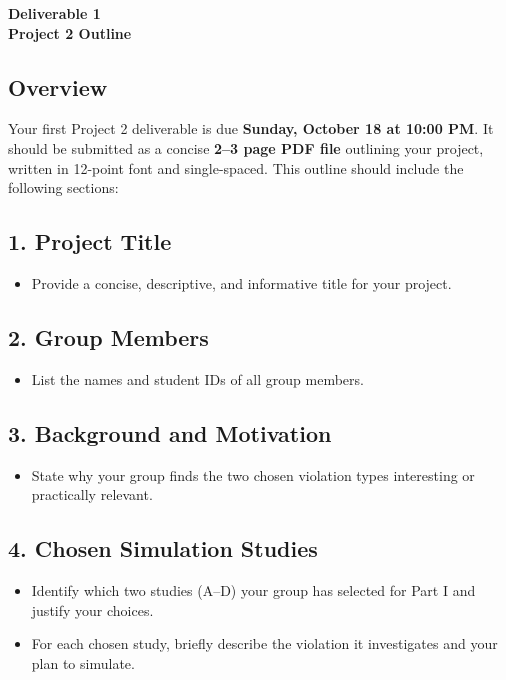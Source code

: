 \documentclass[12pt]{article}
\begin{document}
\begin{center}
\textbf{\Large Deliverable 1 \\ Project 2 Outline}
\end{center}

\subsection*{Overview}
Your first Project 2 deliverable is due \textbf{Sunday, October 18 at 10:00 PM}.
It should be submitted as a concise \textbf{2--3 page PDF file} outlining your project, written in 12-point font and single-spaced.
This outline should include the following sections:

\subsection*{1. Project Title}
\begin{itemize}
    \item Provide a concise, descriptive, and informative title for your project.
\end{itemize}
\subsection*{2. Group Members}
\begin{itemize}
    \item List the names and student IDs of all group members.
\end{itemize}
\subsection*{3. Background and Motivation}
\begin{itemize}
    \item State why your group finds the two chosen violation types interesting or practically relevant.
\end{itemize}
\subsection*{4. Chosen Simulation Studies}
\begin{itemize}
    \item Identify which two studies (A--D) your group has selected for Part I and justify your choices.
    \item For each chosen study, briefly describe the violation it investigates and your plan to simulate.
\end{itemize}
\end{document}
